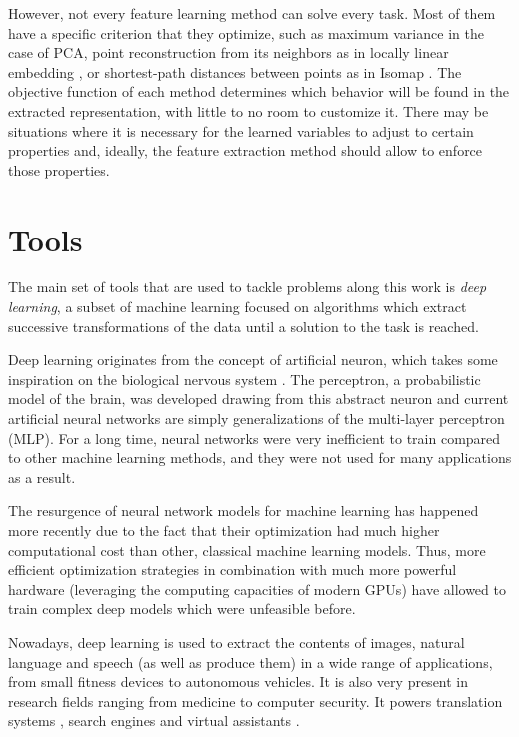 However, not every feature learning method can solve every task. Most of them have a specific criterion that they optimize, such as maximum variance in the case of PCA, point reconstruction from its neighbors as in locally linear embedding , or shortest-path distances between points as in Isomap . The objective function of each method determines which behavior will be found in the extracted representation, with little to no room to customize it. There may be situations where it is necessary for the learned variables to adjust to certain properties and, ideally, the feature extraction method should allow to enforce those properties.

\section{Tools}

The main set of tools that are used to tackle problems along this work is \textit{deep learning}, a subset of machine learning focused on algorithms which extract successive transformations of the data until a solution to the task is reached.

Deep learning originates from the concept of artificial neuron, which takes some inspiration on the biological nervous system . The perceptron, a probabilistic model of the brain, was developed drawing from this abstract neuron  and current artificial neural networks are simply generalizations of the multi-layer perceptron (MLP). For a long time, neural networks were very inefficient to train compared to other machine learning methods, and they were not used for many applications as a result.

The resurgence of neural network models for machine learning has happened more recently due to the fact that their optimization had much higher computational cost than other, classical machine learning models. Thus, more efficient optimization strategies in combination with much more powerful hardware (leveraging the computing capacities of modern GPUs) have allowed to train complex deep models which were unfeasible before.

Nowadays, deep learning is used to extract the contents of images, natural language and speech (as well as produce them) in a wide range of applications, from small fitness devices to autonomous vehicles. It is also very present in research fields ranging from medicine to computer security. It powers translation systems , search engines  and virtual assistants . 

